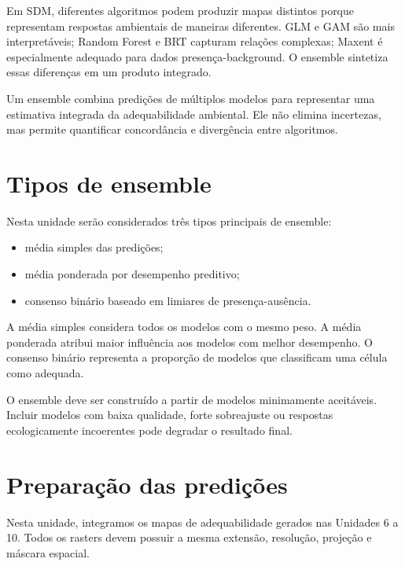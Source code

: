 \documentclass{ueap-sdm}
\begin{document}
Em SDM, diferentes algoritmos podem produzir mapas distintos porque representam respostas ambientais de maneiras diferentes. GLM e GAM são mais interpretáveis; Random Forest e BRT capturam relações complexas; Maxent é especialmente adequado para dados presença-background. O ensemble sintetiza essas diferenças em um produto integrado.

\begin{conceito}[title={\faBook\quad Ensemble em SDM}]
	Um ensemble combina predições de múltiplos modelos para representar uma estimativa integrada da adequabilidade ambiental. Ele não elimina incertezas, mas permite quantificar concordância e divergência entre algoritmos.
\end{conceito}

\section{Tipos de ensemble}

Nesta unidade serão considerados três tipos principais de ensemble:

\begin{itemize}
	\item média simples das predições;
	\item média ponderada por desempenho preditivo;
	\item consenso binário baseado em limiares de presença-ausência.
\end{itemize}

A média simples considera todos os modelos com o mesmo peso. A média ponderada atribui maior influência aos modelos com melhor desempenho. O consenso binário representa a proporção de modelos que classificam uma célula como adequada.

\begin{atencao}[title={\faExclamationTriangle\quad Ensemble não corrige modelo ruim}]
	O ensemble deve ser construído a partir de modelos minimamente aceitáveis. Incluir modelos com baixa qualidade, forte sobreajuste ou respostas ecologicamente incoerentes pode degradar o resultado final.
\end{atencao}

\section{Preparação das predições}

Nesta unidade, integramos os mapas de adequabilidade gerados nas Unidades 6 a 10. Todos os rasters devem possuir a mesma extensão, resolução, projeção e máscara espacial.
\end{document}
